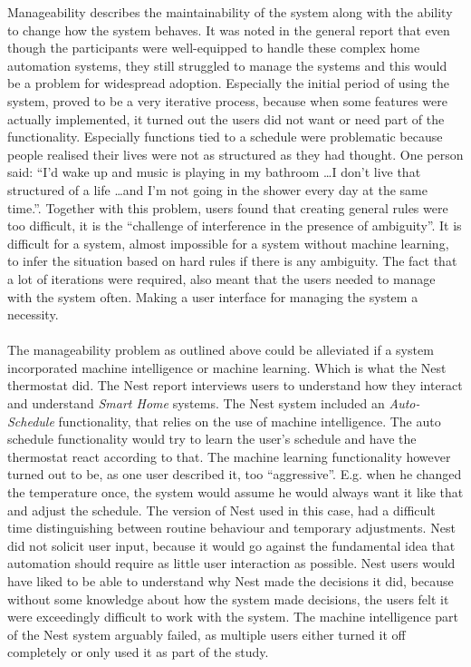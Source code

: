 Manageability describes the maintainability of the system along with the ability
to change how the system behaves. It was noted in the general report that even though the participants were well-equipped to handle these complex home automation systems, they still struggled to manage the systems and this would be a problem for widespread adoption. Especially the initial period of using the system, proved to be a very iterative process, because when some features were actually implemented, it turned out the users did not want or need part of the functionality. Especially functions tied to a schedule were problematic because people realised their lives were not as structured as they had thought. One person said: \enquote{I'd wake up and music is playing in my bathroom \ldots I don't live that structured of a life \ldots and I'm not going in the shower every day at the same time.}. Together with this problem, users found that creating general rules were too difficult, it is the \enquote{challenge of interference in the presence of ambiguity}\cite{HAInterviews}. It is difficult for a system, almost impossible for a system without machine learning, to infer the situation based on hard rules if there is any ambiguity. The fact that a lot of iterations were required, also meant that the users needed to manage with the system often. Making a user interface for managing the system a necessity.
\\\\
The manageability problem as outlined above could be alleviated if a system incorporated machine intelligence or machine learning. Which is what the Nest thermostat did. The Nest report interviews users to understand how they interact and understand \emph{Smart Home} systems. The Nest system included an \emph{Auto-Schedule} functionality, that relies on the use of machine intelligence. The auto schedule functionality would try to learn the user's schedule and have the thermostat react according to that. The machine learning functionality however turned out to be, as one user described it, too \enquote{aggressive}\cite{AdaptiveInterviews}. E.g. when he changed the temperature once, the system would assume he would always want it like that and adjust the schedule. The version of Nest used in this case, had a difficult time distinguishing between routine behaviour and temporary adjustments. Nest did not solicit user input, because it would go against the fundamental idea that automation should require as little user interaction as possible. Nest users would have liked to be able to understand why Nest made the decisions it did, because without some knowledge about how the system made decisions, the users felt it were exceedingly difficult to work with the system. The machine intelligence part of the Nest system arguably failed, as multiple users either turned it off completely or only used it as part of the study.


